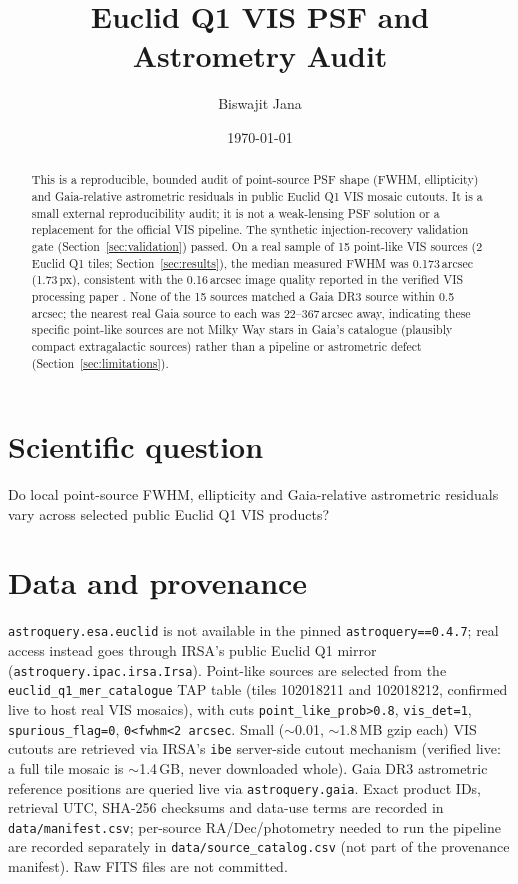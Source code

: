 \documentclass[11pt]{article}
\title{Euclid Q1 VIS PSF and Astrometry Audit}
\author{Biswajit Jana}
\date{\today}
\begin{document}
\maketitle

\begin{abstract}
This is a reproducible, bounded audit of point-source PSF shape (FWHM,
ellipticity) and Gaia-relative astrometric residuals in public Euclid Q1 VIS
mosaic cutouts. It is a small external reproducibility audit; it is not a
weak-lensing PSF solution or a replacement for the official VIS pipeline. The
synthetic injection-recovery validation gate (Section~\ref{sec:validation})
passed. On a real sample of 15 point-like VIS sources (2 Euclid Q1 tiles;
Section~\ref{sec:results}), the median measured FWHM was 0.173\,arcsec
(1.73\,px), consistent with the 0.16\,arcsec image quality reported in the
verified VIS processing paper \citep{EuclidQ1VIS2025}. None of the 15
sources matched a Gaia DR3 source within 0.5\,arcsec; the nearest real Gaia
source to each was 22--367\,arcsec away, indicating these specific
point-like sources are not Milky Way stars in Gaia's catalogue (plausibly
compact extragalactic sources) rather than a pipeline or astrometric
defect (Section~\ref{sec:limitations}).
\end{abstract}

\section{Scientific question}
Do local point-source FWHM, ellipticity and Gaia-relative astrometric
residuals vary across selected public Euclid Q1 VIS products?

\section{Data and provenance}
\label{sec:data}
\texttt{astroquery.esa.euclid} is not available in the pinned
\texttt{astroquery==0.4.7}; real access instead goes through IRSA's public
Euclid Q1 mirror (\texttt{astroquery.ipac.irsa.Irsa}). Point-like sources are
selected from the \texttt{euclid\_q1\_mer\_catalogue} TAP table (tiles
102018211 and 102018212, confirmed live to host real VIS mosaics), with cuts
\texttt{point\_like\_prob>0.8}, \texttt{vis\_det=1}, \texttt{spurious\_flag=0},
\texttt{0<fwhm<2 arcsec}. Small ($\sim$0.01\textdegree, $\sim$1.8\,MB gzip
each) VIS cutouts are retrieved via IRSA's \texttt{ibe} server-side cutout
mechanism (verified live: a full tile mosaic is $\sim$1.4\,GB, never
downloaded whole). Gaia DR3 astrometric reference positions are queried live
via \texttt{astroquery.gaia}. Exact product IDs, retrieval UTC, SHA-256
checksums and data-use terms are recorded in \texttt{data/manifest.csv};
per-source RA/Dec/photometry needed to run the pipeline are recorded
separately in \texttt{data/source\_catalog.csv} (not part of the provenance
manifest). Raw FITS files are not committed.
\end{document}
